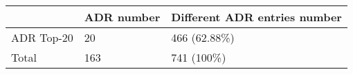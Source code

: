 \begin{tabular}{|p{}|p{}|p{}|}
\hline
                   & ADR number & Different ADR entries number \\ \hline
ADR Top-20 & 20                                          & 466 (62.88\%)                                           \\ \hline
Total     & 163                                         & 741 (100\%)                                             \\ \hline
\end{tabular}